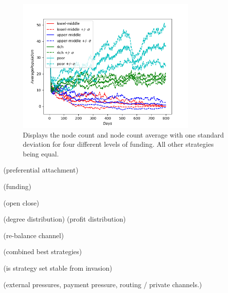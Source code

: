 \begin{figure}[!htb]
	\centering
	\includegraphics[width=9cm]{images/histories_deviation_fund.png}
	\caption{ Displays the node count and node count average with one standard deviation for four different levels of funding. All other strategies being equal.
	}
	\label{fig:funding}
	\hspace*{2mm} 
\end{figure}


(preferential attachment)

(funding)

(open close)

(degree distribution)
(profit distribution)

(re-balance channel)

(combined best strategies)

(is strategy set stable from invasion)

(external pressures, payment pressure, routing / private channels.)